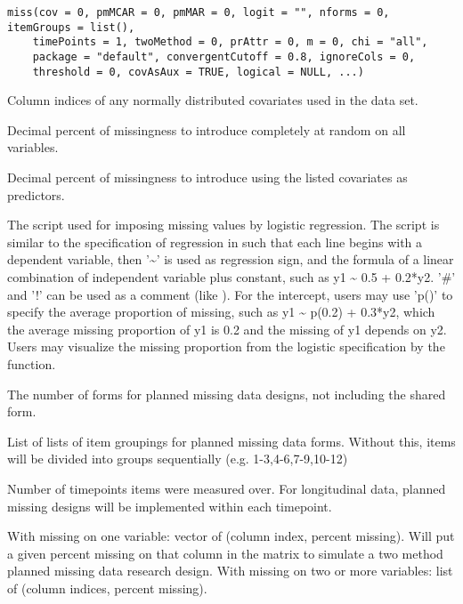 \documentclass[a4paper]{book}
\begin{document}
%
\begin{Usage}
\begin{verbatim}
miss(cov = 0, pmMCAR = 0, pmMAR = 0, logit = "", nforms = 0, itemGroups = list(), 
    timePoints = 1, twoMethod = 0, prAttr = 0, m = 0, chi = "all", 
	package = "default", convergentCutoff = 0.8, ignoreCols = 0, 
    threshold = 0, covAsAux = TRUE, logical = NULL, ...)
\end{verbatim}
\end{Usage}
%
\begin{Arguments}
\begin{ldescription}
\item[\code{cov}] Column indices of any normally distributed covariates used in the data set.
\item[\code{pmMCAR}] Decimal percent of missingness to introduce completely at random on all variables.
\item[\code{pmMAR}] Decimal percent of missingness to introduce using the listed covariates as predictors.
\item[\code{logit}] The script used for imposing missing values by logistic regression. The script is similar to the specification of regression in  such that each line begins with a dependent variable, then '\textasciitilde{}' is used as regression sign, and the formula of a linear combination of independent variable plus constant, such as y1 \textasciitilde{} 0.5 + 0.2*y2. '\#' and '!' can be used as a comment (like ). For the intercept, users may use 'p()' to specify the average proportion of missing, such as y1 \textasciitilde{} p(0.2) + 0.3*y2, which the average missing proportion of y1 is 0.2 and the missing of y1 depends on y2. Users may visualize the missing proportion from the logistic specification by the  function.
\item[\code{nforms}] The number of forms for planned missing data designs, not including the shared form.
\item[\code{itemGroups}] List of lists of item groupings for planned missing data forms. Without this, items will be divided into groups sequentially (e.g. 1-3,4-6,7-9,10-12)
\item[\code{timePoints}] Number of timepoints items were measured over. For longitudinal data, planned missing designs will be implemented within each timepoint.
\item[\code{twoMethod}] With missing on one variable: vector of (column index, percent missing). Will put a given percent missing on that column in the matrix to simulate a two method planned missing data research design. With missing on two or more variables: list of (column indices, percent missing). 

\end{ldescription}
\end{Arguments}
\end{document}
